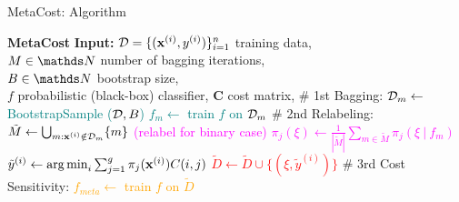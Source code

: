 \documentclass[11pt,compress,t,notes=noshow, xcolor=table]{beamer}
\begin{document}
\begin{vbframe}{MetaCost: Algorithm}
{\begin{minipage}{0.45\textwidth}
\begin{algorithmic}
				\tiny
%				
				\State \textbf{MetaCost}  
				\State \textbf{Input:} 
				$\mathcal{D} = \{(\mathbf{x}^{(i)},y^{(i)})\}_{i=1}^n$ training data, \\
				$M \in \N$ number of bagging iterations, \\
				$B \in \N$ bootstrap size, \\
				$f$ probabilistic (black-box) classifier, 
				$\mathbf{C}$ cost matrix, 
				\State \# 1st Bagging:
				\textcolor{teal}{
					\State $\mathcal{D}_m  \leftarrow $ BootstrapSample ($\mathcal{D},B$)
					\State $f_m  \leftarrow $ train $f$ on $\mathcal{D}_m$
				\EndFor}
				\State \# 2nd Relabeling:
				\textcolor{blue}{
					\State $\tilde M \leftarrow \bigcup_{m: \mathbf{x}^{(i)} \notin \mathcal{D}_m} \{m\}$
					\EndFor}
					\textcolor{magenta}{ (relabel for binary case)
						\State $\pi_j(\xi)  \leftarrow \frac{1}{|\tilde M| } \sum_{m \in \tilde M}   \pi_j(\xi~|~ f_m) $
					\EndFor}
                        \textcolor{red}{\State $\tilde y^{(i)} \leftarrow \operatorname{arg\,min}_{i} \sum_{j=1}^g \pi_j(\mathbf{x}^{(i)}) C(i,j) $
					\State $\tilde D \leftarrow \tilde D \cup \{(\xi,\tilde y^{(i)})\} $
				\EndFor}
				\State \# 3rd Cost Sensitivity:
%				
				\textcolor{orange}{\State $f_{meta} \leftarrow$ train $f$ on $\tilde D$}
%			
			\end{algorithmic}
		\end{minipage}
	}
\end{vbframe}
\end{document}
